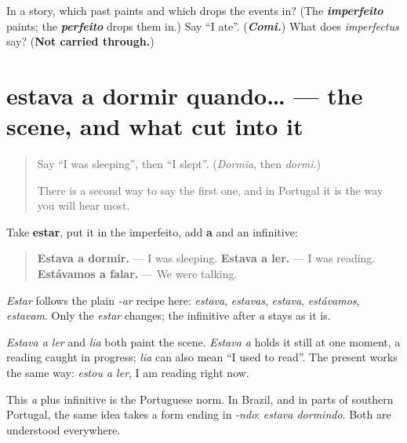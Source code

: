 \begin{tcolorbox}[breakable,colback=teal!4,colframe=teal!35!black,title={Before you move on}]
In a story, which past paints and which drops the events in? (The \emph{\textbf{imperfeito}} paints; the \emph{\textbf{perfeito}} drops them in.) Say \textquotedblleft{}I ate\textquotedblright{}. (\emph{\textbf{Comi.}}) What does \emph{imperfectus} say? (\textbf{Not carried through.})
\end{tcolorbox}
\section[estava a dormir quando…]{estava a dormir quando… — the scene, and what cut into it}

\label{lesson:PT-C259-estava-a}



\begin{quote}
Say \textquotedblleft{}I was sleeping\textquotedblright{}, then \textquotedblleft{}I slept\textquotedblright{}. (\emph{Dormia}, then \emph{dormi}.)

There is a second way to say the first one, and in Portugal it is the way you will hear most.
\end{quote}

\begin{grammarlens}[title={Grammar Lens: estava a, and an infinitive}]
Take \textbf{estar}, put it in the imperfeito, add \textbf{a} and an infinitive:

\begin{quote}
\textbf{Estava a dormir.} — I was sleeping. \textbf{Estava a ler.} — I was reading. \textbf{Estávamos a falar.} — We were talking.
\end{quote}

\emph{Estar} follows the plain \emph{-ar} recipe here: \emph{estava}, \emph{estavas}, \emph{estava}, \emph{estávamos}, \emph{estavam}. Only the \emph{estar} changes; the infinitive after \emph{a} stays as it is.

\emph{Estava a ler} and \emph{lia} both paint the scene. \emph{Estava a} holds it still at one moment, a reading caught in progress; \emph{lia} can also mean \textquotedblleft{}I used to read\textquotedblright{}. The present works the same way: \emph{estou a ler}, I am reading right now.

This \emph{a} plus infinitive is the Portuguese norm. In Brazil, and in parts of southern Portugal, the same idea takes a form ending in \emph{-ndo}: \emph{estava dormindo}. Both are understood everywhere.
\end{grammarlens}

